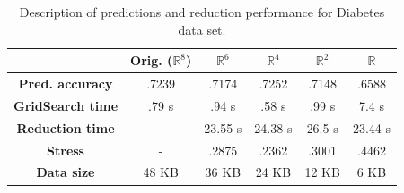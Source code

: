 \begin{table}[H]
	\centering
	\begin{tabular}{|c|c|c|c|c|c|}
		\hline
		& \textbf{Orig. ($\mathbb{R}^{8}$}) & \textbf{$\mathbb{R}^{6}$} & \textbf{$\mathbb{R}^{4}$} & \textbf{$\mathbb{R}^{2}$} & \textbf{$\mathbb{R}$} \\\hline
		\textbf{Pred. accuracy}   & .7239 & .7174 & .7252 & .7148 & .6588 \\\hline
		\textbf{GridSearch time}   & .79 s & .94 s & .58 s & .99 s & 7.4 s \\\hline
		\textbf{Reduction time}    & - & 23.55 s & 24.38 s & 26.5 s & 23.44 s \\\hline
		\textbf{Stress} & - & .2875 & .2362 & .3001 & .4462 \\\hline
		\textbf{Data size}  & 48 KB & 36 KB & 24 KB & 12 KB & 6 KB \\\hline
	\end{tabular}
	\captionsetup{justification=centering}
	\caption{Description of predictions and reduction performance for Diabetes data set.}
\end{table}
